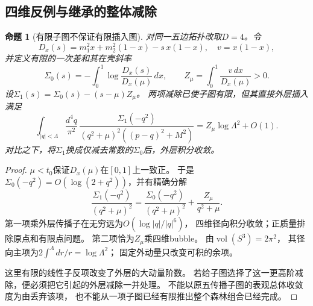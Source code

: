\documentclass[11pt,a4paper]{ctexart}
\theoremstyle{cnplain}\newtheorem{theorem}{定理}[section]
\newtheorem{proposition}[theorem]{命题}
\theoremstyle{definition}\newtheorem{definition}[theorem]{定义}
\theoremstyle{remark}\newtheorem{remark}[theorem]{注}
\begin{document}
\subsection{四维反例与继承的整体减除}
\begin{proposition}[有限子图不保证有限插入图]\label{prop:oversubtraction}
对同一五边拓扑改取$D=4$。令
\[
 D_x(s)=m_1^2x+m_2^2(1-x)-s\,x(1-x),\quad v=x(1-x),
\]
并定义有限的一次差和其在壳斜率
\[
 \Sigma_0(s)=-\int_0^1\log\frac{D_x(s)}{D_x(\mu)}\,dx,\qquad
 Z_\mu=\int_0^1\frac{v\,dx}{D_x(\mu)}>0.
\]
设$\Sigma_1(s)=\Sigma_0(s)-(s-\mu)Z_\mu$。
两项减除已使子图有限，但其直接外层插入满足
\begin{equation}\label{eq:oversubdiv}
 \int_{|q|<\Lambda}\frac{d^4q}{\pi^2}\,
 \frac{\Sigma_1(-q^2)}
 {(q^2+\mu)^2((p-q)^2+M^2)}
       =Z_\mu\log\Lambda^2+O(1).
\end{equation}
对比之下，将$\Sigma_1$换成仅减去常数的$\Sigma_0$后，外层积分收敛。
\end{proposition}
\begin{proof}
$\mu<t_0$保证$D_x(\mu)$在$[0,1]$上一致正。
于是$\Sigma_0(-q^2)=O(\log(2+q^2))$，并有精确分解
\[
 \frac{\Sigma_1(-q^2)}{(q^2+\mu)^2}
 =\frac{\Sigma_0(-q^2)}{(q^2+\mu)^2}
       +\frac{Z_\mu}{q^2+\mu}.
\]
第一项乘外层传播子在无穷远为$O(\log|q|/|q|^6)$，
四维径向积分收敛；正质量排除原点和有限点问题。
第二项恰为$Z_\mu$乘四维bubble。
由$\operatorname{vol}(S^3)=2\pi^2$，
其径向主项为$2\int^\Lambda dr/r=\log\Lambda^2$；
固定外动量只改变可积的余项。

这里有限的线性子反项改变了外层的大动量阶数。
若给子图选择了这一更高阶减除，便必须把它引起的外层减除一并处理。
不能以原五传播子图的表观总体收敛度为由丢弃该项，
也不能从一项子图已经有限推出整个森林组合已经完成。
\end{proof}
\end{document}
